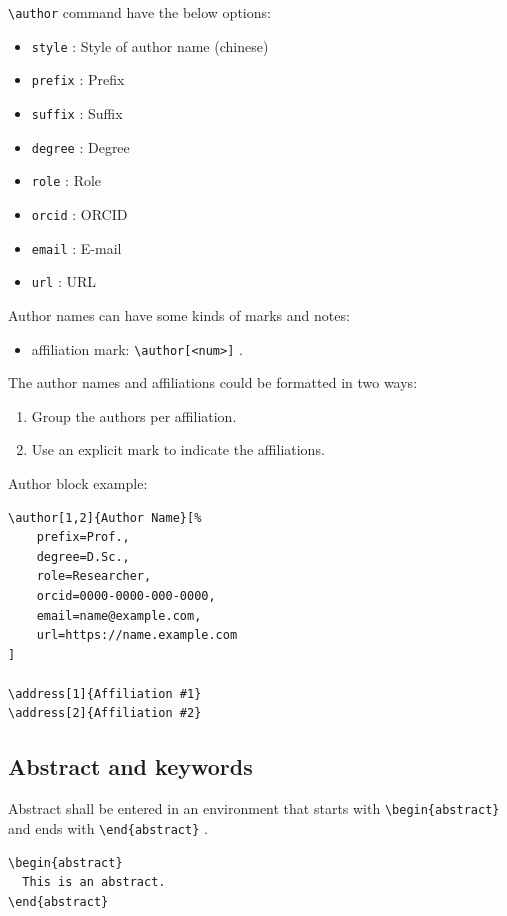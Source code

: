 \documentclass[%
]{ceurart}
\begin{document}
\verb|\author|
command have the below options:
\begin{itemize}
\item
\verb|style|
 : Style of author name (chinese)
\item
\verb|prefix|
 : Prefix
\item
\verb|suffix|
 : Suffix
\item
\verb|degree|
 : Degree
\item
\verb|role|
 : Role
\item
\verb|orcid|
 : ORCID
\item
\verb|email|
 : E-mail
\item
\verb|url|
 : URL
\end{itemize}

Author names can have some kinds of marks and notes:
\begin{itemize}
\item affiliation mark:
\verb|\author[<num>]|
.
\end{itemize}

The author names and affiliations could be formatted in two ways:
\begin{enumerate}
\item Group the authors per affiliation.
\item Use an explicit mark to indicate the affiliations.
\end{enumerate}

Author block example:
\begin{lstlisting}[language={[latex]TeX}]
\author[1,2]{Author Name}[%
    prefix=Prof.,
    degree=D.Sc.,
    role=Researcher,
    orcid=0000-0000-000-0000,
    email=name@example.com,
    url=https://name.example.com
]

\address[1]{Affiliation #1}
\address[2]{Affiliation #2}
\end{lstlisting}

\subsection{Abstract and keywords}

Abstract shall be entered in an environment that starts with
\verb|\begin{abstract}|
 and ends with
\verb|\end{abstract}|
.

\begin{lstlisting}[language={[latex]TeX}]
\begin{abstract}
  This is an abstract.
\end{abstract}
\end{lstlisting}
\end{document}
